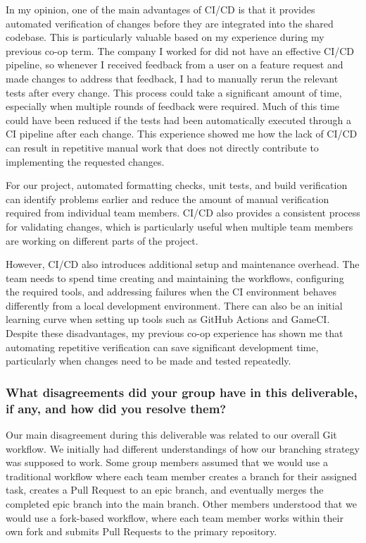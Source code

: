 \documentclass{article}
\begin{document}
In my opinion, one of the main advantages of CI/CD is that it provides automated verification of changes before they are integrated into the shared codebase. This is particularly valuable based on my experience during my previous co-op term. The company I worked for did not have an effective CI/CD pipeline, so whenever I received feedback from a user on a feature request and made changes to address that feedback, I had to manually rerun the relevant tests after every change. This process could take a significant amount of time, especially when multiple rounds of feedback were required. Much of this time could have been reduced if the tests had been automatically executed through a CI pipeline after each change. This experience showed me how the lack of CI/CD can result in repetitive manual work that does not directly contribute to implementing the requested changes.

For our project, automated formatting checks, unit tests, and build verification can identify problems earlier and reduce the amount of manual verification required from individual team members. CI/CD also provides a consistent process for validating changes, which is particularly useful when multiple team members are working on different parts of the project.

However, CI/CD also introduces additional setup and maintenance overhead. The team needs to spend time creating and maintaining the workflows, configuring the required tools, and addressing failures when the CI environment behaves differently from a local development environment. There can also be an initial learning curve when setting up tools such as GitHub Actions and GameCI. Despite these disadvantages, my previous co-op experience has shown me that automating repetitive verification can save significant development time, particularly when changes need to be made and tested repeatedly.

\subsubsection*{What disagreements did your group have in this deliverable, if any, and how did you resolve them?}

Our main disagreement during this deliverable was related to our overall Git workflow. We initially had different understandings of how our branching strategy was supposed to work. Some group members assumed that we would use a traditional workflow where each team member creates a branch for their assigned task, creates a Pull Request to an epic branch, and eventually merges the completed epic branch into the main branch. Other members understood that we would use a fork-based workflow, where each team member works within their own fork and submits Pull Requests to the primary repository.
\end{document}
